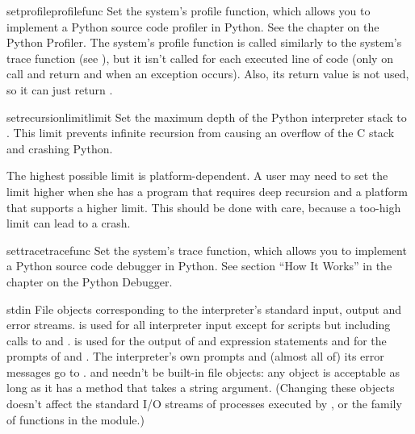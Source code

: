 \begin{funcdesc}{setprofile}{profilefunc}
  Set the system's profile function, which allows you to implement a
  Python source code profiler in Python.  See the chapter on the
  Python Profiler.  The system's profile function
  is called similarly to the system's trace function (see
  ), but it isn't called for each executed line of
  code (only on call and return and when an exception occurs).  Also,
  its return value is not used, so it can just return .
\end{funcdesc}

\begin{funcdesc}{setrecursionlimit}{limit}
Set the maximum depth of the Python interpreter stack to .
This limit prevents infinite recursion from causing an overflow of the
C stack and crashing Python.  

The highest possible limit is platform-dependent.  A user may need to
set the limit higher when she has a program that requires deep
recursion and a platform that supports a higher limit.  This should be
done with care, because a too-high limit can lead to a crash.
\end{funcdesc}

\begin{funcdesc}{settrace}{tracefunc}
  Set the system's trace function, which allows you to implement a
  Python source code debugger in Python.  See section ``How It Works''
  in the chapter on the Python Debugger.
\end{funcdesc}

\begin{datadesc}{stdin}
  File objects corresponding to the interpreter's standard input,
  output and error streams.   is used for all
  interpreter input except for scripts but including calls to
   and
  .   is used
  for the output of  and expression statements and for the
  prompts of  and .  The interpreter's
  own prompts and (almost all of) its error messages go to
  .   and  needn't
  be built-in file objects: any object is acceptable as long as it has
  a  method that takes a string argument.  (Changing these
  objects doesn't affect the standard I/O streams of processes
  executed by ,  or the
   family of functions in the  module.)
\end{datadesc}

